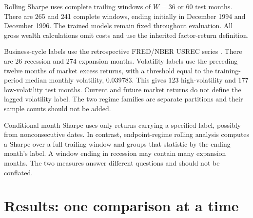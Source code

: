 \documentclass[11pt]{article}
\begin{document}
Rolling Sharpe uses complete trailing windows of $W=36$ or $60$ test months. There are 265 and 241 complete windows, ending initially in December 1994 and December 1996. The trained models remain fixed throughout evaluation. All gross wealth calculations omit costs and use the inherited factor-return definition.

Business-cycle labels use the retrospective FRED/NBER USREC series \cite{fred}. There are 26 recession and 274 expansion months. Volatility labels use the preceding twelve months of market excess returns, with a threshold equal to the training-period median monthly volatility, 0.039783. This gives 123 high-volatility and 177 low-volatility test months. Current and future market returns do not define the lagged volatility label. The two regime families are separate partitions and their sample counts should not be added.

Conditional-month Sharpe uses only returns carrying a specified label, possibly from nonconsecutive dates. In contrast, endpoint-regime rolling analysis computes a Sharpe over a full trailing window and groups that statistic by the ending month's label. A window ending in recession may contain many expansion months. The two measures answer different questions and should not be conflated.
\section{Results: one comparison at a time}
\end{document}
